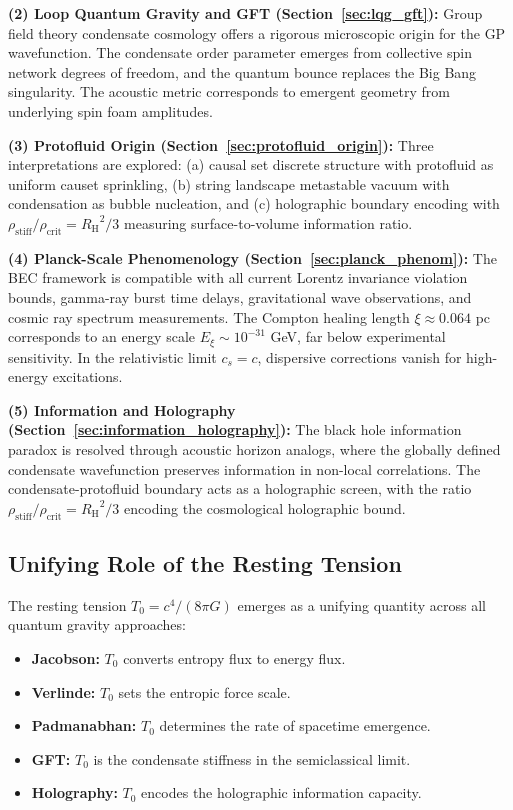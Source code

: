 \documentclass[11pt,a4paper]{article}
\newcommand{\rhocrit}{\ensuremath{\rho_{\mathrm{crit}}}}
\newcommand{\rhostiff}{\ensuremath{\rho_{\mathrm{stiff}}}}
\newcommand{\Tzero}{\ensuremath{T_0}}
\newcommand{\cs}{\ensuremath{c_s}}
\newcommand{\RH}{\ensuremath{R_{\mathrm{H}}}}
\theoremstyle{definition}
\theoremstyle{remark}
\begin{document}
\textbf{(2) Loop Quantum Gravity and GFT (Section~\ref{sec:lqg_gft}):} Group field theory condensate cosmology offers a rigorous microscopic origin for the GP wavefunction. The condensate order parameter emerges from collective spin network degrees of freedom, and the quantum bounce replaces the Big Bang singularity. The acoustic metric corresponds to emergent geometry from underlying spin foam amplitudes.

\textbf{(3) Protofluid Origin (Section~\ref{sec:protofluid_origin}):} Three interpretations are explored: (a) causal set discrete structure with protofluid as uniform causet sprinkling, (b) string landscape metastable vacuum with condensation as bubble nucleation, and (c) holographic boundary encoding with $\rhostiff/\rhocrit = \RH^2/3$ measuring surface-to-volume information ratio.

\textbf{(4) Planck-Scale Phenomenology (Section~\ref{sec:planck_phenom}):} The BEC framework is compatible with all current Lorentz invariance violation bounds, gamma-ray burst time delays, gravitational wave observations, and cosmic ray spectrum measurements. The Compton healing length $\xi \approx 0.064$ pc corresponds to an energy scale $E_\xi \sim 10^{-31}$ GeV, far below experimental sensitivity. In the relativistic limit $\cs = c$, dispersive corrections vanish for high-energy excitations.

\textbf{(5) Information and Holography (Section~\ref{sec:information_holography}):} The black hole information paradox is resolved through acoustic horizon analogs, where the globally defined condensate wavefunction preserves information in non-local correlations. The condensate-protofluid boundary acts as a holographic screen, with the ratio $\rhostiff/\rhocrit = \RH^2/3$ encoding the cosmological holographic bound.

\subsection{Unifying Role of the Resting Tension}
\label{sec:unifying_role}

The resting tension $\Tzero = c^4/(8\pi G)$ emerges as a unifying quantity across all quantum gravity approaches:
\begin{itemize}
\item \textbf{Jacobson:} $\Tzero$ converts entropy flux to energy flux.
\item \textbf{Verlinde:} $\Tzero$ sets the entropic force scale.
\item \textbf{Padmanabhan:} $\Tzero$ determines the rate of spacetime emergence.
\item \textbf{GFT:} $\Tzero$ is the condensate stiffness in the semiclassical limit.
\item \textbf{Holography:} $\Tzero$ encodes the holographic information capacity.
\end{itemize}
\end{document}
